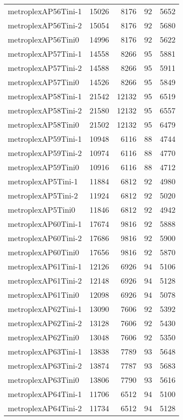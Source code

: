 \begin{longtable}{lrrrr}
metroplexAP56Tini-1 & 15026 & 8176 & 92 & 5652 \\
metroplexAP56Tini-2 & 15054 & 8176 & 92 & 5680 \\
metroplexAP56Tini0 & 14996 & 8176 & 92 & 5622 \\
metroplexAP57Tini-1 & 14558 & 8266 & 95 & 5881 \\
metroplexAP57Tini-2 & 14588 & 8266 & 95 & 5911 \\
metroplexAP57Tini0 & 14526 & 8266 & 95 & 5849 \\
metroplexAP58Tini-1 & 21542 & 12132 & 95 & 6519 \\
metroplexAP58Tini-2 & 21580 & 12132 & 95 & 6557 \\
metroplexAP58Tini0 & 21502 & 12132 & 95 & 6479 \\
metroplexAP59Tini-1 & 10948 & 6116 & 88 & 4744 \\
metroplexAP59Tini-2 & 10974 & 6116 & 88 & 4770 \\
metroplexAP59Tini0 & 10916 & 6116 & 88 & 4712 \\
metroplexAP5Tini-1 & 11884 & 6812 & 92 & 4980 \\
metroplexAP5Tini-2 & 11924 & 6812 & 92 & 5020 \\
metroplexAP5Tini0 & 11846 & 6812 & 92 & 4942 \\
metroplexAP60Tini-1 & 17674 & 9816 & 92 & 5888 \\
metroplexAP60Tini-2 & 17686 & 9816 & 92 & 5900 \\
metroplexAP60Tini0 & 17656 & 9816 & 92 & 5870 \\
metroplexAP61Tini-1 & 12126 & 6926 & 94 & 5106 \\
metroplexAP61Tini-2 & 12148 & 6926 & 94 & 5128 \\
metroplexAP61Tini0 & 12098 & 6926 & 94 & 5078 \\
metroplexAP62Tini-1 & 13090 & 7606 & 92 & 5392 \\
metroplexAP62Tini-2 & 13128 & 7606 & 92 & 5430 \\
metroplexAP62Tini0 & 13048 & 7606 & 92 & 5350 \\
metroplexAP63Tini-1 & 13838 & 7789 & 93 & 5648 \\
metroplexAP63Tini-2 & 13874 & 7787 & 93 & 5683 \\
metroplexAP63Tini0 & 13806 & 7790 & 93 & 5616 \\
metroplexAP64Tini-1 & 11706 & 6512 & 94 & 5100 \\
metroplexAP64Tini-2 & 11734 & 6512 & 94 & 5128 \\

\end{longtable}

